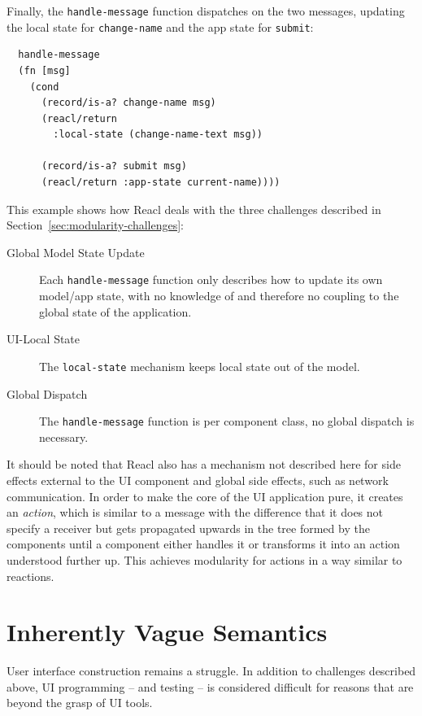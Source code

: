 \documentclass[sigplan,review,screen]{acmart}
\begin{document}
Finally, the \texttt{handle-message} function dispatches on the two
messages, updating the local state for \texttt{change-name} and the
app state for \texttt{submit}:
%
\begin{verbatim}
  handle-message
  (fn [msg]
    (cond
      (record/is-a? change-name msg)
      (reacl/return
        :local-state (change-name-text msg))

      (record/is-a? submit msg)
      (reacl/return :app-state current-name))))
\end{verbatim}
%
This example shows how Reacl deals with the three challenges described
in Section~\ref{sec:modularity-challenges}:
%
\begin{description}
\item[Global Model State Update] Each \texttt{handle-message} function
  only describes how to update its own model/app state, with no
  knowledge of and therefore no coupling to the global state of the
  application.
\item[UI-Local State] The \texttt{local-state} mechanism keeps local
  state out of the model.
\item[Global Dispatch] The \texttt{handle-message} function is per
  component class, no global dispatch is necessary.
\end{description}
%
It should be noted that Reacl also has a mechanism not described here
for side effects external to the UI component and global side effects,
such as network
communication.  In order to make the core of the UI application pure,
it creates an \textit{action}, which is similar to a message with the
difference that it does not specify a receiver but gets propagated
upwards in the tree formed by the components until a component either
handles it or transforms it into an action understood further up.
This achieves modularity for actions in a way similar to reactions.

\section{Inherently Vague Semantics}
\label{sec:vague-semantics}

User interface construction remains a struggle. In addition to
challenges described above, UI programming -- and testing -- is
considered difficult for reasons that are beyond the grasp of UI
tools.
\end{document}
